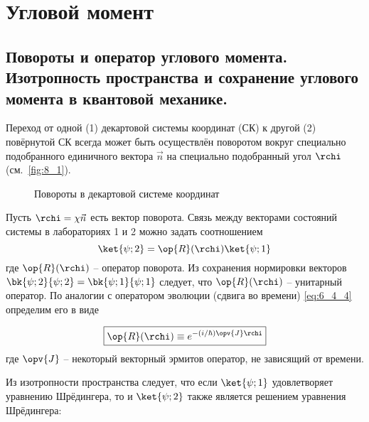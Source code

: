 \chapter{Угловой момент}

\section{Повороты и оператор углового момента. Изотропность пространства и сохранение углового момента в квантовой механике.}

Переход от одной (1) декартовой системы координат (СК) к другой (2) повёрнутой СК всегда может быть осуществлён поворотом вокруг специально подобранного единичного вектора $\vec{n}$ на специально подобранный угол $\rchi$ (см.~\autoref{fig:8_1}).

\begin{figure}[h]
\centering
{}
\caption{Повороты в декартовой системе координат} \label{fig:8_1}
\end{figure}

Пусть $\rchi = \chi \vec{n}$ есть вектор поворота. Связь между векторами состояний системы в лабораториях 1 и 2 можно задать соотношением
$$
\ket{\psi;2} = \op{R}(\rchi) \ket{\psi;1}
$$%
%
где $\op{R}(\rchi)$ -- оператор поворота. Из сохранения нормировки векторов $\bk{\psi;2}{\psi;2} = \bk{\psi;1}{\psi;1}$ следует, что $\op{R}(\rchi)$ -- унитарный оператор. По аналогии с оператором эволюции (сдвига во времени) \eqref{eq:6_4_4} определим его в виде

\begin{equation}
\label{eq:8_1_1}
\boxed {
	\op{R}(\rchi) \equiv e^{-(i/\hbar) \opv{J} \rchi}
}
\end{equation}
где $\opv{J}$ -- некоторый векторный эрмитов оператор, не зависящий от времени.

Из изотропности пространства следует, что если $\ket{\psi;1}$ удовлетворяет уравнению Шрёдингера, то и $\ket{\psi;2}$ также является решением уравнения Шрёдингера:


